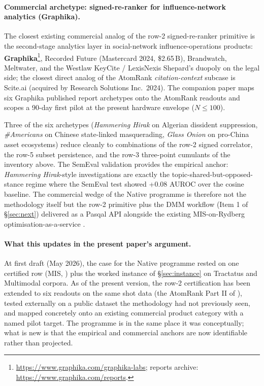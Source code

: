 \documentclass[10pt]{article}
\begin{document}
\paragraph{Commercial archetype: signed-re-ranker for influence-network analytics (Graphika).}
The closest existing commercial analog of the row-2 signed-re-ranker primitive is the second-stage analytics layer in social-network influence-operations products: \textbf{Graphika}\footnote{\url{https://www.graphika.com/graphika-labs}; reports archive: \url{https://www.graphika.com/reports}.}, Recorded Future (Mastercard 2024, \$2.65\,B), Brandwatch, Meltwater, and the Westlaw KeyCite / LexisNexis Shepard's duopoly on the legal side; the closest direct analog of the AtomRank \emph{citation-context} subcase is Scite.ai (acquired by Research Solutions Inc.\ 2024). The companion paper \cite{jurczak2026atomrank} maps six Graphika published report archetypes onto the AtomRank readouts and scopes a 90-day first pilot at the present hardware envelope ($N \leq 100$).

Three of the six archetypes (\emph{Hammering Hirak} on Algerian dissident suppression, \emph{\#Americans} on Chinese state-linked masquerading, \emph{Glass Onion} on pro-China asset ecosystems) reduce cleanly to combinations of the row-2 signed correlator, the row-5 subset persistence, and the row-3 three-point cumulants of the inventory above. The SemEval validation provides the empirical anchor: \emph{Hammering Hirak}-style investigations are exactly the topic-shared-but-opposed-stance regime where the SemEval test showed +0.08 AUROC over the cosine baseline. The commercial wedge of the Native programme is therefore not the methodology itself but the row-2 primitive plus the DMM workflow (Item 1 of \S\ref{sec:next}) delivered as a Pasqal API alongside the existing MIS-on-Rydberg optimisation-as-a-service \cite{ebadi2022quantum,henriet2020quantum,pasqal2025mwis}.

\paragraph{What this updates in the present paper's argument.}
At first draft (May 2026), the case for the Native programme rested on one certified row (MIS, \cite{ebadi2022quantum}) plus the worked instance of \S\ref{sec:instance} on Tractatus and Multimodal corpora. As of the present version, the row-2 certification has been extended to six readouts on the same shot data (the AtomRank Part II of \cite{jurczak2026atomrank}), tested externally on a public dataset the methodology had not previously seen, and mapped concretely onto an existing commercial product category with a named pilot target. The programme is in the same place it was conceptually; what is new is that the empirical and commercial anchors are now identifiable rather than projected.



\end{document}
